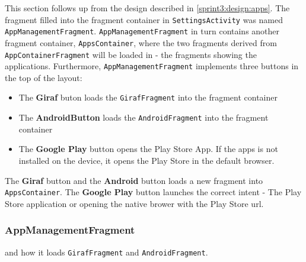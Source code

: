 
This section follows up from the design described in \cref{sprint3:design:apps}.
The fragment filled into the fragment container in \lstinline!SettingsActivity! was named \lstinline!AppManagementFragment!.
\lstinline!AppManagementFragment! in turn contains another fragment container, \lstinline!AppsContainer!, where the two fragments derived from \lstinline!AppContainerFragment! will be loaded in - the fragments showing the applications.
Furthermore, \lstinline!AppManagementFragment! implements three buttons in the top of the layout:

\begin{itemize}
\item The \textbf{Giraf} buton loads the \lstinline!GirafFragment! into the fragment container
\item The \textbf{AndroidButton} loads the \lstinline!AndroidFragment! into the fragment container
\item The \textbf{Google Play} button opens the Play Store App. If the apps is not installed on the device, it opens the Play Store in the default browser.
\end{itemize}

The \textbf{Giraf} button and the \textbf{Android} button loads a new fragment into \lstinline!AppsContainer!.
The \textbf{Google Play} button launches the correct intent - The Play Store application or opening the native brower with the Play Store url.

\subsubsection{AppManagementFragment}

 and how it loads \lstinline!GirafFragment! and  \lstinline!AndroidFragment!.


